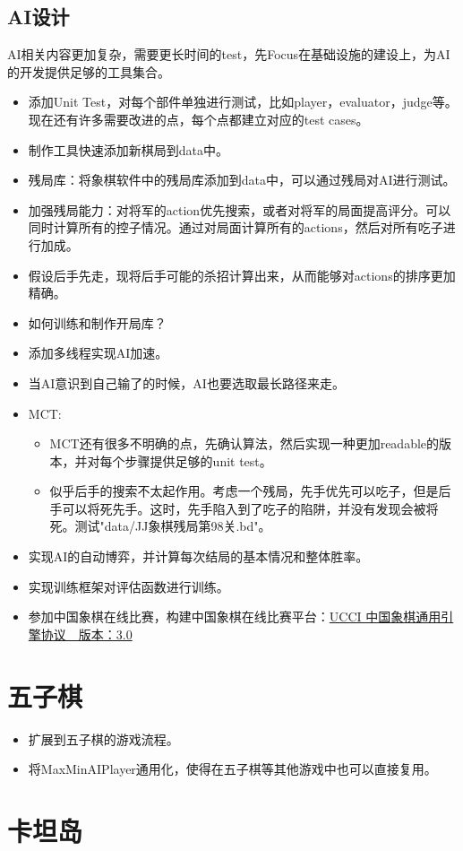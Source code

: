 \documentclass[export, 12pt, letterpaper]{ctexrep}
\begin{document}
\subsection{AI设计}

AI相关内容更加复杂，需要更长时间的test，先Focus在基础设施的建设上，为AI的开发提供足够的工具集合。


\begin{itemize}
\item{ 添加Unit Test，对每个部件单独进行测试，比如player，evaluator，judge等。现在还有许多需要改进的点，每个点都建立对应的test cases。 }
\item{ 制作工具快速添加新棋局到data中。 }
\item{ 残局库：将象棋软件中的残局库添加到data中，可以通过残局对AI进行测试。 }
\item{ 加强残局能力：对将军的action优先搜索，或者对将军的局面提高评分。可以同时计算所有的控子情况。通过对局面计算所有的actions，然后对所有吃子进行加成。 }
\item{ 假设后手先走，现将后手可能的杀招计算出来，从而能够对actions的排序更加精确。 }
\item{ 如何训练和制作开局库？ }
\item{ 添加多线程实现AI加速。 }
\item{ 当AI意识到自己输了的时候，AI也要选取最长路径来走。 }
\item{ MCT:
\begin{itemize}
\item{ MCT还有很多不明确的点，先确认算法，然后实现一种更加readable的版本，并对每个步骤提供足够的unit test。 }
\item{ 似乎后手的搜索不太起作用。考虑一个残局，先手优先可以吃子，但是后手可以将死先手。这时，先手陷入到了吃子的陷阱，并没有发现会被将死。测试"data/JJ象棋残局第98关.bd"。 }
\end{itemize}
 }
\item{ 实现AI的自动博弈，并计算每次结局的基本情况和整体胜率。 }
\item{ 实现训练框架对评估函数进行训练。 }
\item{ 参加中国象棋在线比赛，构建中国象棋在线比赛平台：\href{https://www.xqbase.com/protocol/cchess_ucci.htm}{UCCI 中国象棋通用引擎协议　版本：3.0} }
\end{itemize}



\section{五子棋}


\begin{itemize}
\item{ 扩展到五子棋的游戏流程。 }
\item{ 将MaxMinAIPlayer通用化，使得在五子棋等其他游戏中也可以直接复用。 }
\end{itemize}


\section{卡坦岛}
\end{document}
